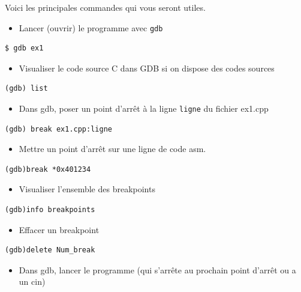 \documentclass[french, 12pt]{article}%
\newcommand{\itemE}{\item[$\bullet$]}
\begin{document}
Voici les principales commandes qui vous seront utiles.
\begin{itemize}
\itemE Lancer (ouvrir) le programme avec \verb?gdb?
\end{itemize}

\begin{lstlisting}[style=commande]
$ gdb ex1
\end{lstlisting}


\begin{itemize}
\itemE Visualiser le code source C dans GDB si on dispose des codes sources
\end{itemize}

\begin{lstlisting}[style=commande]
(gdb) list
\end{lstlisting}

\begin{itemize}
\itemE Dans gdb,  poser un point d'arrêt à la ligne \verb?ligne? du fichier ex1.cpp
\end{itemize}

\begin{lstlisting}[style=commande]
(gdb) break ex1.cpp:ligne
\end{lstlisting}

\begin{itemize}
\itemE Mettre un point d'arrêt sur une ligne de code asm.
\end{itemize}

\begin{lstlisting}[style=commande]
(gdb)break *0x401234
\end{lstlisting}


\begin{itemize}
\itemE Visualiser l'ensemble des breakpoints
\end{itemize}

\begin{lstlisting}[style=commande]
(gdb)info breakpoints
\end{lstlisting}

\begin{itemize}
\itemE Effacer un breakpoint
\end{itemize}

\begin{lstlisting}[style=commande]
(gdb)delete Num_break
\end{lstlisting}

\begin{itemize}
\itemE Dans gdb, lancer le programme (qui s'arrête au prochain point d'arrêt ou a un cin)
\end{itemize}
\end{document}
